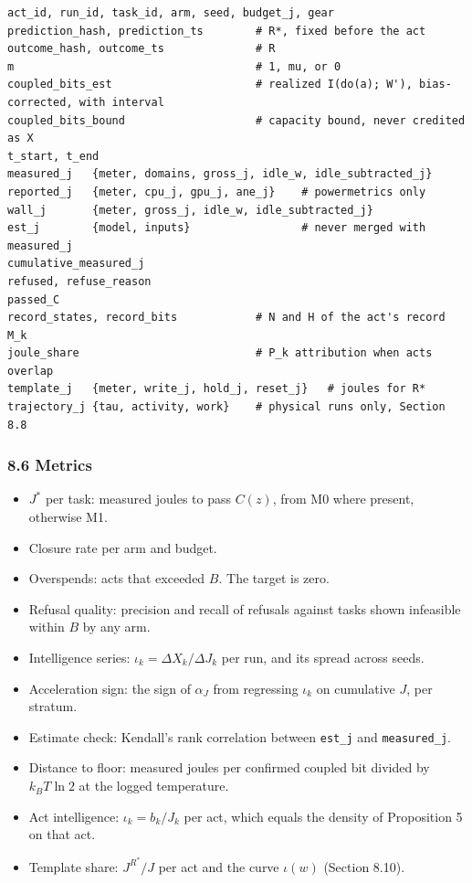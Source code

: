 \documentclass[
  10pt,
]{article}
\providecommand{\tightlist}{%
  \setlength{\itemsep}{0pt}\setlength{\parskip}{0pt}}
\begin{document}
\begin{verbatim}
act_id, run_id, task_id, arm, seed, budget_j, gear
prediction_hash, prediction_ts        # R*, fixed before the act
outcome_hash, outcome_ts              # R
m                                     # 1, mu, or 0
coupled_bits_est                      # realized I(do(a); W'), bias-corrected, with interval
coupled_bits_bound                    # capacity bound, never credited as X
t_start, t_end
measured_j   {meter, domains, gross_j, idle_w, idle_subtracted_j}
reported_j   {meter, cpu_j, gpu_j, ane_j}    # powermetrics only
wall_j       {meter, gross_j, idle_w, idle_subtracted_j}
est_j        {model, inputs}                 # never merged with measured_j
cumulative_measured_j
refused, refuse_reason
passed_C
record_states, record_bits            # N and H of the act's record M_k
joule_share                           # P_k attribution when acts overlap
template_j   {meter, write_j, hold_j, reset_j}   # joules for R*
trajectory_j {tau, activity, work}    # physical runs only, Section 8.8
\end{verbatim}

\subsubsection{8.6 Metrics}\label{metrics}

\begin{itemize}
\tightlist
\item
  \(J^*\) per task: measured joules to pass \(C(z)\), from M0 where
  present, otherwise M1.
\item
  Closure rate per arm and budget.
\item
  Overspends: acts that exceeded \(B\). The target is zero.
\item
  Refusal quality: precision and recall of refusals against tasks shown
  infeasible within \(B\) by any arm.
\item
  Intelligence series: \(\iota_k = \Delta X_k/\Delta J_k\) per run, and
  its spread across seeds.
\item
  Acceleration sign: the sign of \(\alpha_J\) from regressing
  \(\iota_k\) on cumulative \(J\), per stratum.
\item
  Estimate check: Kendall's rank correlation between \texttt{est\_j} and
  \texttt{measured\_j}.
\item
  Distance to floor: measured joules per confirmed coupled bit divided
  by \(k_B T \ln 2\) at the logged temperature.
\item
  Act intelligence: \(\iota_k = b_k/J_k\) per act, which equals the
  density of Proposition 5 on that act.
\item
  Template share: \(J^{R^*}/J\) per act and the curve \(\iota(w)\)
  (Section 8.10).
\end{itemize}
\end{document}
